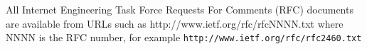 \begin{thebibliography}{}







 All Internet Engineering Task Force Requests For Comments (RFC) documents are available
from URLs such as http://www.ietf.org/rfc/rfcNNNN.txt where NNNN is the RFC number, for example {\tt http://www.ietf.org/rfc/rfc2460.txt}


\end{thebibliography}

